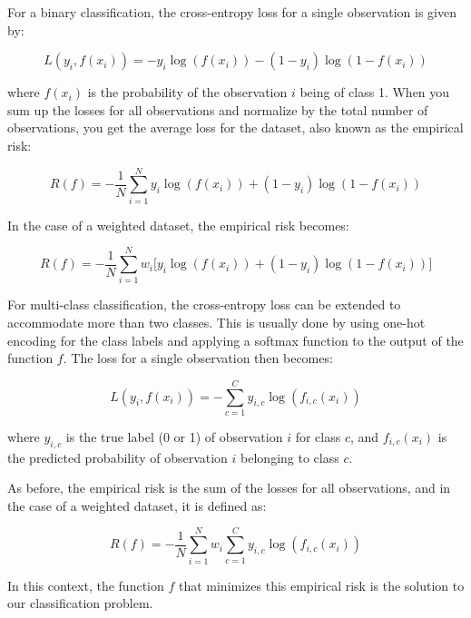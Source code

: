 For a binary classification, the cross-entropy loss for a single observation is given by:

$$ L(y_i, f(x_i)) = -y_i \log(f(x_i)) - (1 - y_i) \log(1 - f(x_i)) $$

where $f(x_i)$ is the probability of the observation $i$ being of class 1. When you sum up the losses for all
observations and normalize by the total number of observations, you get the average loss for the dataset, also known as
the empirical risk:

$$ R(f) = -\frac{1}{N}\sum_{i=1}^{N} y_i \log(f(x_i)) + (1 - y_i) \log(1 - f(x_i)) $$

In the case of a weighted dataset, the empirical risk becomes:

$$ R(f) = -\frac{1}{N}\sum_{i=1}^{N} w_i \big[ y_i \log(f(x_i)) + (1 - y_i) \log(1 - f(x_i)) \big] $$

For multi-class classification, the cross-entropy loss can be extended to accommodate more than two classes. This is
usually done by using one-hot encoding for the class labels and applying a softmax function to the output of the
function $f$. The loss for a single observation then becomes:

$$ L(y_i, f(x_i)) = - \sum_{c=1}^{C} y_{i,c} \log(f_{i,c}(x_i)) $$

where $y_{i,c}$ is the true label (0 or 1) of observation $i$ for class $c$, and $f_{i,c}(x_i)$ is the predicted
probability of observation $i$ belonging to class $c$.

As before, the empirical risk is the sum of the losses for all observations, and in the case of a weighted dataset, it
is defined as:

$$ R(f) = -\frac{1}{N}\sum_{i=1}^{N} w_i \sum_{c=1}^{C} y_{i,c} \log(f_{i,c}(x_i)) $$

In this context, the function $f$ that minimizes this empirical risk is the solution to our classification problem.